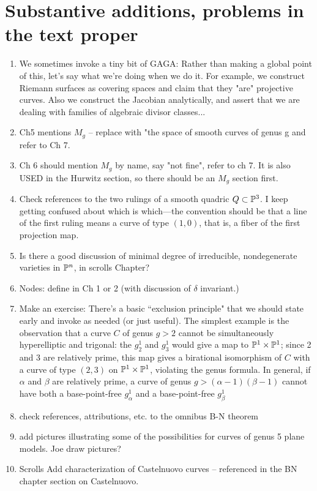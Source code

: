 \documentclass[12pt, leqno]{book}
\begin{document}
\section{Substantive additions, problems in the text proper}


\begin{enumerate}
 
 \item We sometimes invoke a tiny bit of GAGA: Rather than making a global point of this, let's say what we're doing when we do it. For example, we construct Riemann surfaces
 as covering spaces and claim that they "are" projective curves. Also we construct the Jacobian analytically, and assert that
 we are dealing with families of algebraic divisor classes...
 
 \item Ch5 mentions $M_g$ -- replace with "the space of smooth curves of genus g and refer to Ch 7.
 
 \item Ch 6 should mention $M_g$ by name, say "not fine", refer to ch 7. It is also USED in the Hurwitz section, so there should be an $M_g$ section first.
 
 
\item Check references to the two rulings of a smooth quadric $Q \subset \PP^3$. I keep getting confused about which is which---the convention should be that a line of the first ruling means a curve of type $(1,0)$, that is, a fiber of the first projection map.

\item Is there a good discussion of minimal degree of irreducible, nondegenerate varieties in $\PP^n$, in scrolls Chapter?

\item Nodes: define in Ch 1 or 2 (with discussion of $\delta$ invariant.)


\item Make an exercise: There's a basic ``exclusion principle" that we should state early and invoke as needed (or just useful). The simplest example is the observation that a curve $C$ of genus $g > 2$ cannot be simultaneously hyperelliptic and trigonal: the $g^1_2$ and $g^1_3$ would give a map to $\PP^1 \times \PP^1$; since 2 and 3 are relatively prime, this map gives a birational isomorphism of $C$ with a curve of type $(2,3)$ on $\PP^1 \times \PP^1$, violating the genus formula. In general, if $\alpha$ and $\beta$ are relatively prime, a curve of genus $g > (\alpha - 1)(\beta - 1)$ cannot have both a base-point-free $g^1_\alpha$ and a base-point-free $g^1_\beta$


\item {check references, attributions, etc.} to the omnibus B-N theorem


\item add pictures illustrating some of the possibilities for curves of genus 5  plane models. Joe draw pictures?

\item{Scrolls}
Add characterization of Castelnuovo curves -- referenced in the BN chapter section on Castelnuovo.


\end{enumerate}
\end{document}
